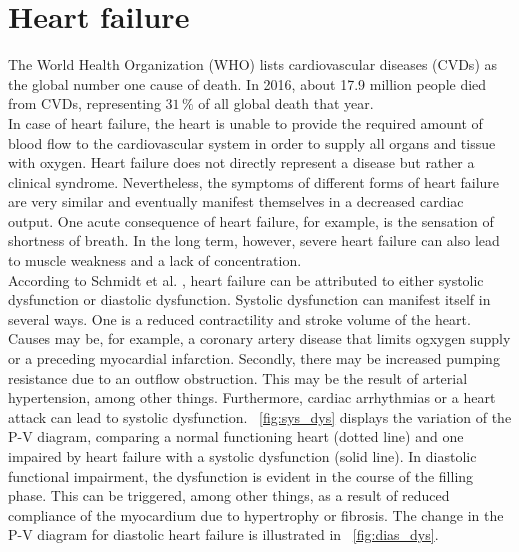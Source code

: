 \section{Heart failure}
The World Health Organization (WHO) lists cardiovascular diseases (CVDs) as the global number one cause of death. In 2016, about 17.9 million people died from CVDs, representing $31 \,\%$ of all global death that year. \cite{WHO}
\\In case of heart failure, the heart is unable to provide the required amount of blood flow to the cardiovascular system in order to supply all organs and tissue with oxygen.
Heart failure does not directly represent a disease but rather a clinical syndrome. Nevertheless, the symptoms of different forms of heart failure are very similar and eventually manifest themselves in a decreased cardiac output. One acute consequence of heart failure, for example, is the sensation of shortness of breath. In the long term, however, severe heart failure can also lead to muscle weakness and a lack of concentration.
\\According to Schmidt et al. \cite{HKS4}, heart failure can be attributed to either systolic dysfunction or diastolic dysfunction. Systolic dysfunction can manifest itself in several ways. One is a reduced contractility and stroke volume of the heart. Causes may be, for example, a coronary artery disease that limits ogxygen supply or a preceding myocardial infarction. Secondly, there may be increased pumping resistance due to an outflow obstruction.  This may be the result of arterial hypertension, among other things. Furthermore, cardiac arrhythmias or a heart attack can lead to systolic dysfunction. \figurename~\ref{fig:sys_dys} displays the variation of the P-V diagram, comparing a normal functioning heart (dotted line) and one impaired by heart failure with a systolic dysfunction (solid line). In diastolic functional impairment, the dysfunction is evident in the course of the filling phase. This can be triggered, among other things, as a result of reduced compliance of the myocardium due to hypertrophy or fibrosis. The change in the P-V diagram for diastolic heart failure is illustrated in \figurename~\ref{fig:dias_dys}.
